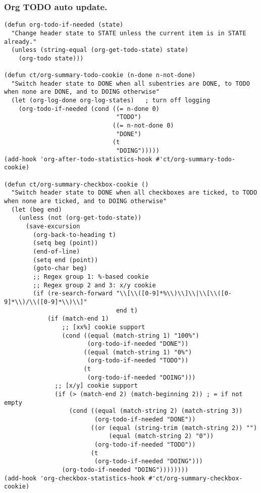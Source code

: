 \documentclass[11pt]{article}
\begin{document}
\subsubsection{Org TODO auto update.}
\label{sec:orge7157c4}
\begin{verbatim}
(defun org-todo-if-needed (state)
  "Change header state to STATE unless the current item is in STATE already."
  (unless (string-equal (org-get-todo-state) state)
    (org-todo state)))

(defun ct/org-summary-todo-cookie (n-done n-not-done)
  "Switch header state to DONE when all subentries are DONE, to TODO when none are DONE, and to DOING otherwise"
  (let (org-log-done org-log-states)   ; turn off logging
    (org-todo-if-needed (cond ((= n-done 0)
                               "TODO")
                              ((= n-not-done 0)
                               "DONE")
                              (t
                               "DOING")))))
(add-hook 'org-after-todo-statistics-hook #'ct/org-summary-todo-cookie)

(defun ct/org-summary-checkbox-cookie ()
  "Switch header state to DONE when all checkboxes are ticked, to TODO when none are ticked, and to DOING otherwise"
  (let (beg end)
    (unless (not (org-get-todo-state))
      (save-excursion
        (org-back-to-heading t)
        (setq beg (point))
        (end-of-line)
        (setq end (point))
        (goto-char beg)
        ;; Regex group 1: %-based cookie
        ;; Regex group 2 and 3: x/y cookie
        (if (re-search-forward "\\[\\([0-9]*%\\)\\]\\|\\[\\([0-9]*\\)/\\([0-9]*\\)\\]"
                               end t)
            (if (match-end 1)
                ;; [xx%] cookie support
                (cond ((equal (match-string 1) "100%")
                       (org-todo-if-needed "DONE"))
                      ((equal (match-string 1) "0%")
                       (org-todo-if-needed "TODO"))
                      (t
                       (org-todo-if-needed "DOING")))
              ;; [x/y] cookie support
              (if (> (match-end 2) (match-beginning 2)) ; = if not empty
                  (cond ((equal (match-string 2) (match-string 3))
                         (org-todo-if-needed "DONE"))
                        ((or (equal (string-trim (match-string 2)) "")
                             (equal (match-string 2) "0"))
                         (org-todo-if-needed "TODO"))
                        (t
                         (org-todo-if-needed "DOING")))
                (org-todo-if-needed "DOING"))))))))
(add-hook 'org-checkbox-statistics-hook #'ct/org-summary-checkbox-cookie)
\end{verbatim}
\end{document}
